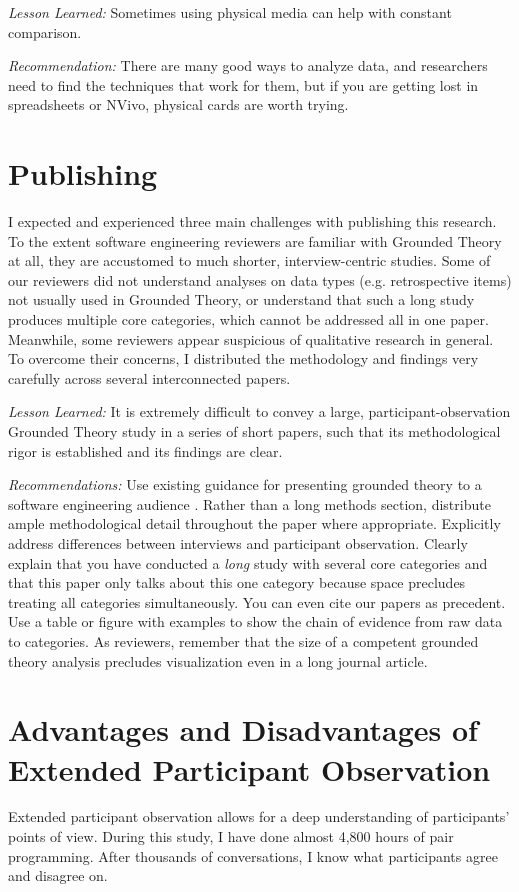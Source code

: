 \textit{Lesson Learned:} Sometimes using physical media can help with constant comparison. 

\textit{Recommendation:} There are many good ways to analyze data, and researchers need to find the techniques that work for them, but if you are getting lost in spreadsheets or NVivo, physical cards are worth trying.
\section{Publishing}
\label{Publishing}

I expected and experienced three main challenges with publishing this research. To the extent software engineering reviewers are familiar with Grounded Theory at all, they are accustomed to much shorter, interview-centric studies. Some of our reviewers did not understand analyses on data types (e.g. retrospective items) not usually used in Grounded Theory, or understand that such a long study produces multiple core categories, which cannot be addressed all in one paper. Meanwhile, some reviewers appear suspicious of qualitative research in general. To overcome their concerns, I distributed the methodology and findings very carefully across several interconnected papers. 

\textit{Lesson Learned:} It is extremely difficult to convey a large, participant-observation Grounded Theory study in a series of short papers, such that its methodological rigor is established and its findings are clear.

\textit{Recommendations:} Use existing guidance for presenting grounded theory to a software engineering audience \cite{StolGroundedTheory}. Rather than a long methods section, distribute ample methodological detail throughout the paper where appropriate. Explicitly address differences between interviews and participant observation. Clearly explain that you have conducted a \textit{long} study with several core categories and that this paper only talks about this one category because space precludes treating all categories simultaneously. You can even cite our papers as precedent. Use a table or figure with examples to show the chain of evidence from raw data to categories. As reviewers, remember that the size of a competent grounded theory analysis precludes visualization even in a long journal article.
\section{Advantages and Disadvantages of Extended Participant Observation}
\label{AdvantagesDisadvantages}
Extended participant observation allows for a deep understanding of participants' points of view. During this study, I have done almost 4,800 hours of pair programming. After thousands of conversations, I know what participants agree and disagree on. 

